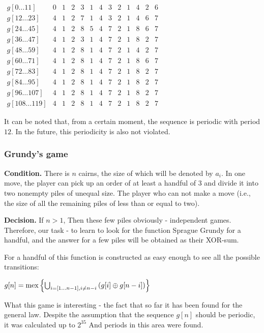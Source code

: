 $\begin{array}{ccccccccccccc}
g[0\ldots11] & 0 & 1 & 2 & 3 & 1 & 4 & 3 & 2 & 1 & 4 & 2 & 6\\
g[12\ldots23] & 4 & 1 & 2 & 7 & 1 & 4 & 3 & 2 & 1 & 4 & 6 & 7\\
g[24\ldots45] & 4 & 1 & 2 & 8 & 5 & 4 & 7 & 2 & 1 & 8 & 6 & 7\\
g[36\ldots47] & 4 & 1 & 2 & 3 & 1 & 4 & 7 & 2 & 1 & 8 & 2 & 7\\
g[48\ldots59] & 4 & 1 & 2 & 8 & 1 & 4 & 7 & 2 & 1 & 4 & 2 & 7\\
g[60\ldots71] & 4 & 1 & 2 & 8 & 1 & 4 & 7 & 2 & 1 & 8 & 6 & 7\\
g[72\ldots83] & 4 & 1 & 2 & 8 & 1 & 4 & 7 & 2 & 1 & 8 & 2 & 7\\
g[84\ldots95] & 4 & 1 & 2 & 8 & 1 & 4 & 7 & 2 & 1 & 8 & 2 & 7\\
g[96\ldots107] & 4 & 1 & 2 & 8 & 1 & 4 & 7 & 2 & 1 & 8 & 2 & 7\\
g[108\ldots119] & 4 & 1 & 2 & 8 & 1 & 4 & 7 & 2 & 1 & 8 & 2 & 7
\end{array}$

It can be noted that, from a certain moment, the sequence is periodic with period $12$. In the future, this periodicity is also not violated.

\subsubsection{ Grundy's game }

\textbf{Condition.} There is $n$ cairns, the size of which will be denoted by $a_i$. In one move, the player can pick up an order of at least a handful of $3$ and divide it into two nonempty piles of unequal size. The player who can not make a move (i.e., the size of all the remaining piles of less than or equal to two).

\textbf{Decision.} If $n> 1$, Then these few piles obviously - independent games. Therefore, our task - to learn to look for the function Sprague Grundy for a handful, and the answer for a few piles will be obtained as their XOR-sum.

For a handful of this function is constructed as easy enough to see all the possible transitions:

$g[n]={\rm mex}\left\{ \bigcup_{i=[1\ldots n-1],i\ne n-i}\left(g[i]\oplus g[n-i]\right)\right\} $

What this game is interesting - the fact that so far it has been found for the general law. Despite the assumption that the sequence $g [n]$ should be periodic, it was calculated up to $2 ^ {35}$ And periods in this area were found.

